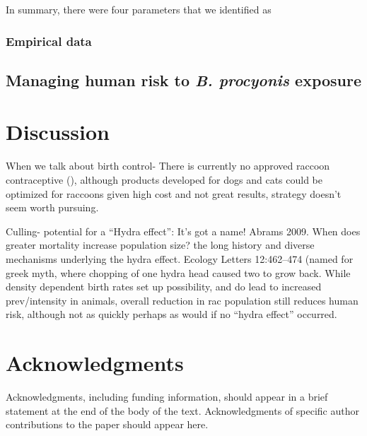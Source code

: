 \documentclass[11pt]{article}
\begin{document}
In summary, there were four parameters that we identified as 

\subsubsection{Empirical data}



\subsection{Managing human risk to \emph{B. procyonis} exposure}

\section{Discussion}

When we talk about birth control- There is currently no approved raccoon
contraceptive (), although products developed for dogs and cats could be
optimized for raccoons given high cost and not great results, strategy
doesn't seem worth pursuing.

Culling- potential for a ``Hydra effect'': It's got a name! Abrams 2009.
When does greater mortality increase population size? the long history
and diverse mechanisms underlying the hydra effect. Ecology Letters
12:462--474 (named for greek myth, where chopping of one hydra head
caused two to grow back. While density dependent birth rates set up
possibility, and do lead to increased prev/intensity in animals, overall
reduction in rac population still reduces human risk, although not as
quickly perhaps as would if no ``hydra effect'' occurred.

\section{Acknowledgments} 

Acknowledgments, including funding
information, should appear in a brief statement at the end of the body
of the text. Acknowledgments of specific author contributions to the
paper should appear here.



\end{document}
